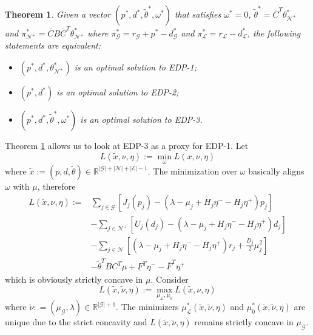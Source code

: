 \documentclass[journal,12pt,onecolumn,draftclsnofoot]{IEEEtran}
\newtheorem{theorem}{\textbf{Theorem}}
\newcommand{\beq}{\begin{equation}}
\newcommand{\eeq}{\end{equation}}
\begin{document}
\begin{theorem}\label{teo:equiv}
	Given a vector $(p^*,d^*,\tilde{\theta}^*,\omega^*)$ that satisfies $\omega^*={0}$, $\tilde \theta^* = \bar C^T \theta^*_{\mathcal{N}^+}$ and $\pi^*_{\mathcal{N}^+}=\bar CB\bar{C}^T\theta^*_{\mathcal{N}^+}$ where $\pi^*_{\mathcal{G}}=r_\mathcal{G}+p^*-d^*_\mathcal{G}$ and $\pi^*_{\mathcal{L}}=r_\mathcal{L}-d^*_\mathcal{L}$, the following statements are equivalent:
	\begin{itemize}
		\item $(p^*,d^*,{\theta^*_{\mathcal{N}^+}})$ is an optimal solution to EDP-1;
		\item $(p^*,d^*)$ is an optimal solution to EDP-2;
		\item $(p^*,d^*,\tilde{\theta}^*,\omega^*)$ is an optimal solution to EDP-3.
	\end{itemize}
\end{theorem}

Theorem \ref{teo:equiv} allows us to look at EDP-3 as a proxy for EDP-1.
Let 
\beq\label{eq:dalg:1}
L(\tilde x,  \nu,\eta):=  \min_{\omega}  L(x,\nu,\eta)
\eeq
where $\tilde x:= (p,d,\tilde \theta) \in\mathbb{R}^{|\mathcal{G}|+|\mathcal{N}|+|\mathcal{E}|-1}$. The minimization over $\omega$ basically aligns $\omega$ with $\mu$, therefore 
\begin{equation}\label{eq:Lagrangian2}
	\begin{split}
		 L(\tilde x, \nu,\eta) := & \sum_{j\in\mathcal{G}} \left[J_j(p_j) - (\lambda-\mu_j + H_j \eta^- - H_j \eta^+)p_j \right]\\
		 &  - \sum_{j\in\mathcal{N}^+} \left[ U_j(d_j) - (\lambda-\mu_j + H_j \eta^- - H_j \eta^+)d_j \right] \\
		 & - \sum_{j\in\mathcal{N}} \left[ (\lambda-\mu_j + H_j \eta^- - H_j \eta^+) r_j  +  \frac{D_j}{2} \mu_j^2   \right] \\
		 & -\tilde{\theta}^T B C^T \mu +\underline{F}^T \eta^- - \overline{F}^T \eta^+   
	\end{split}
\end{equation}
which is obviously strictly concave in $\mu$. Consider 
\beq\label{eq:dalg:2}
L(\tilde x,  \tilde \nu, \eta):=  \max_{\mu_{\mathcal{L}},\mu_0}  L(\tilde x,\nu, \eta)
\eeq
where $\tilde \nu : = (\mu_\mathcal{G},\lambda)\in\mathbb{R}^{|\mathcal{G}|+1}$. The minimizers $\mu_{\mathcal{L}}^*(\tilde{x},\tilde{\nu}, \eta)$ and $\mu_0^*(\tilde{x},\tilde{\nu}, \eta)$ are unique due to the strict concavity and $L(\tilde{x},\tilde{\nu},\eta)$ remains strictly concave in $\mu_{\mathcal{G}}$.
\end{document}
